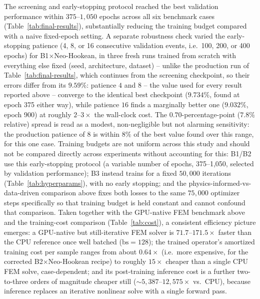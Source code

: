 \documentclass[final,5p,times]{elsarticle}
\begin{document}
The screening and early-stopping protocol reached the best validation
performance within $375$--$1{,}050$ epochs across all six benchmark cases
(Table~\ref{tab:final-results}), substantially reducing the training
budget compared with a naive fixed-epoch setting. A separate robustness
check varied the early-stopping patience (4, 8, or 16 consecutive
validation events, i.e.\ 100, 200, or 400 epochs) for
B1$\times$Neo-Hookean, in three fresh runs trained from scratch with
everything else fixed (seed, architecture, dataset) -- unlike the
production run of Table~\ref{tab:final-results}, which continues from
the screening checkpoint, so their errors differ from its $9.59\%$: patience $4$ and
$8$ -- the value used for every result reported above -- converge to the
identical best checkpoint ($9.734\%$, found at epoch 375 either way),
while patience $16$ finds a marginally better one ($9.032\%$, epoch 900)
at roughly $2$--$3\times$ the wall-clock cost. The $0.70$-percentage-point
($7.8\%$ relative) spread is read as a modest, non-negligible but not
alarming sensitivity: the production patience of $8$ is within $8\%$ of
the best value found over this range, for this one case. Training
budgets are not uniform across this study and should not be compared directly across
experiments without accounting for this: B1/B2 use this early-stopping
protocol (a variable number of epochs, 375--1,050, selected by
validation performance); B3 instead trains for a fixed $50{,}000$
iterations (Table~\ref{tab:hyperparams}), with no early stopping; and
the physics-informed-vs-data-driven comparison above fixes both losses
to the same $75{,}000$ optimizer steps specifically so that training
budget is held constant and cannot confound that comparison. Taken
together with the
GPU-native FEM benchmark above and the training-cost
comparison (Table~\ref{tab:cost}), a consistent efficiency picture
emerges: a GPU-native but still-iterative FEM solver is $71.7$--$171.5\times$
faster than the CPU reference once well batched ($\mathrm{bs}{=}128$); the
trained operator's amortized training cost per sample ranges from about
$0.64\times$ (i.e.\ more expensive, for the corrected
B2$\times$Neo-Hookean recipe) to roughly $15\times$ cheaper than a single
CPU FEM solve, case-dependent; and its post-training inference cost is a
further two-to-three orders of magnitude cheaper still
($\sim$$5{,}387$--$12{,}575\times$ vs.\ CPU), because inference replaces an
iterative nonlinear solve with a single forward pass.
\end{document}

